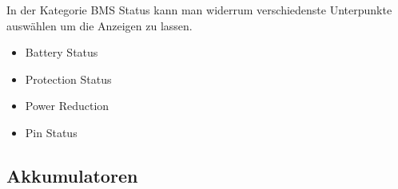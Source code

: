 In der Kategorie BMS Status kann man widerrum verschiedenste Unterpunkte auswählen um die Anzeigen zu lassen.

\begin{itemize}
\item{Battery Status}\\
\item{Protection Status}\\
\item{Power Reduction}\\
\item{Pin Status}\\
\end{itemize}

\subsection{Akkumulatoren}


